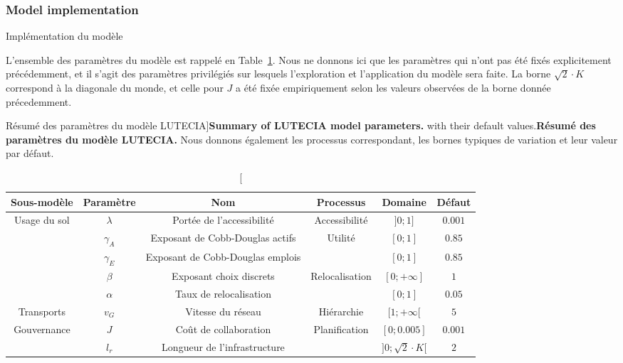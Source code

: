 \subsubsection{Model implementation}{Implémentation du modèle}


L'ensemble des paramètres du modèle est rappelé en Table~\ref{tab:lutecia:parameters}. Nous ne donnons ici que les paramètres qui n'ont pas été fixés explicitement précédemment, et il s'agit des paramètres privilégiés sur lesquels l'exploration et l'application du modèle sera faite. La borne $\sqrt{2}\cdot K$ correspond à la diagonale du monde, et celle pour $J$ a été fixée empiriquement selon les valeurs observées de la borne donnée précedemment.


\begin{table}
\caption[Summary of LUTECIA model parameters][Résumé des paramètres du modèle LUTECIA]{\textbf{Summary of LUTECIA model parameters.} with their default values.\label{tab:lutecia:parameters}}{\textbf{Résumé des paramètres du modèle LUTECIA.} Nous donnons également les processus correspondant, les bornes typiques de variation et leur valeur par défaut.\label{tab:lutecia:parameters}}
\begin{tabular}{|c|c|c|c|c|c|}
  \hline
 Sous-modèle & Paramètre & Nom & Processus & Domaine & Défaut\\
  \hline
\multirow{5}{*}{Usage du sol}& $\lambda$ & Portée de l'accessibilité & Accessibilité & $]0;1]$ & $0.001$ \\\cline{2-6}
 & $\gamma_A$ & Exposant de Cobb-Douglas actifs & \multirow{2}{*}{Utilité} & $[0;1]$ & $0.85$ \\\cline{2-3}\cline{5-6}
 & $\gamma_E$ & Exposant de Cobb-Douglas emplois &  & $[0;1]$ & $0.85$ \\\cline{2-6}
 & $\beta$ & Exposant choix discrets & \multirow{2}{*}{Relocalisation} & $[0;+\infty]$ & $1$ \\\cline{2-3}\cline{5-6}
 & $\alpha$ & Taux de relocalisation &  & $[0;1]$ & $0.05$ \\\hline
Transports & $v_G$ & Vitesse du réseau & Hiérarchie & $[1;+\infty [$ & $5$ \\\hline
\multirow{2}{*}{Gouvernance} & $J$ & Coût de collaboration & \multirow{2}{*}{Planification} & $[0;0.005]$ & $0.001$ \\\cline{2-3}\cline{5-6}
 & $l_r$ & Longueur de l'infrastructure &  & $]0;\sqrt{2}\cdot K [$ & $2$ \\\hline
\end{tabular}
\end{table}



